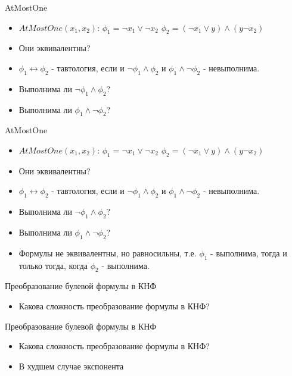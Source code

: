 \documentclass{beamer}
\begin{document}
\begin{frame}{AtMostOne}
\begin{itemize}
\item $AtMostOne(x_1, x_2)$:\newline
$\phi_1 = \lnot x_1 \vee \lnot x_2$\newline
$\phi_2 = (\lnot x_1 \vee y) \wedge (y \lnot x_2)$\newline
\item Они эквивалентны?
\item $\phi_1 \leftrightarrow \phi_2$ - тавтология, если и $\lnot \phi_1 \wedge \phi_2$ и $\phi_1 \wedge \lnot \phi_2$ -
невыполнима.
\item Выполнима ли $\lnot \phi_1 \wedge \phi_2$?
\item Выполнима ли $\phi_1 \wedge \lnot \phi_2$?
\end{itemize}
\end{frame}

\begin{frame}{AtMostOne}
\begin{itemize}
\item $AtMostOne(x_1, x_2)$:\newline
$\phi_1 = \lnot x_1 \vee \lnot x_2$\newline
$\phi_2 = (\lnot x_1 \vee y) \wedge (y \lnot x_2)$\newline
\item Они эквивалентны?
\item $\phi_1 \leftrightarrow \phi_2$ - тавтология, если и $\lnot \phi_1 \wedge \phi_2$ и $\phi_1 \wedge \lnot \phi_2$ -
невыполнима.
\item Выполнима ли $\lnot \phi_1 \wedge \phi_2$?
\item Выполнима ли $\phi_1 \wedge \lnot \phi_2$?
\item Формулы не эквивалентны, но равносильны, т.е. $\phi_1$ - выполнима, тогда и только тогда, когда $\phi_2$ - выполнима.
\end{itemize}
\end{frame}

\begin{frame}{Преобразование булевой формулы в КНФ}
\begin{itemize}
\item Какова сложность преобразование формулы в КНФ?
\end{itemize}
\end{frame}

\begin{frame}{Преобразование булевой формулы в КНФ}
\begin{itemize}
\item Какова сложность преобразование формулы в КНФ?
\item В худшем случае экспонента
\end{itemize}
\end{frame}
\end{document}
